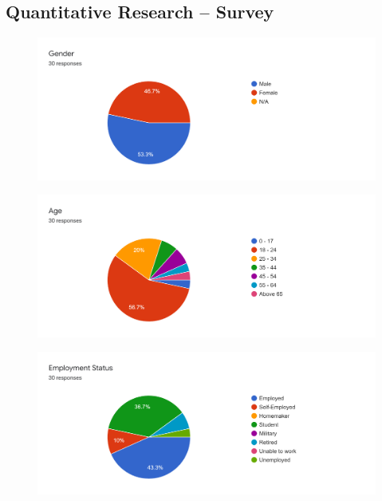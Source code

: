 \newpage

\begin{appendices}
  \section{Quantitative Research – Survey} \label{appendix:quantitative}
  
    \begin{figure}[H]
      \centering
      \includegraphics[width=\linewidth]{img/Survey/Q1.png}
    \end{figure}
    \begin{figure}[H]
      \centering
      \includegraphics[width=\linewidth]{img/Survey/Q2.png}
    \end{figure}
    \begin{figure}[H]
      \centering
      \includegraphics[width=\linewidth]{img/Survey/Q3.png}

\end{figure}
\end{appendices}
